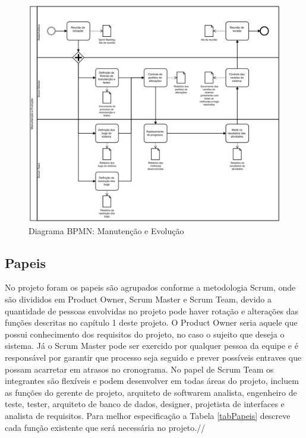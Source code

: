 \documentclass[	DIV=calc,%
							paper=a4,%
							fontsize=12pt,%
							onecolumn]{scrartcl}%
\begin{document}
\begin{figure}
\centering
\includegraphics[width=\textwidth]{manutencao-evolucao.png}
\caption{Diagrama BPMN: Manutenção e Evolução}
\label{manutencao}
\end{figure}
\FloatBarrier




\subsection{Papeis}
No projeto foram os papeis são agrupados conforme a metodologia Scrum, onde são divididos em Product Owner, Scrum Master e Scrum Team, devido a quantidade de pessoas envolvidas no projeto pode haver rotação e alterações das funções descritas no capítulo 1 deste projeto. O Product Owner seria aquele que possui conhecimento dos requisitos do projeto, no caso o sujeito que deseja o sistema. Já o Scrum Master pode ser exercido por qualquer pessoa da equipe e é responsável por garantir que processo seja seguido e prever possíveis entraves que possam acarretar em atrasos no cronograma. No papel de Scrum Team os integrantes são flexíveis e podem desenvolver em todas áreas do projeto, incluem as funções do gerente de projeto, arquiteto de softwarem analista, engenheiro de teste, tester, arquiteto de banco de dados, designer, projetista de interfaces e analista de requisitos. Para melhor especificação a Tabela \ref{tabPapeis} descreve cada função existente que será necessária no projeto.//
\end{document}
